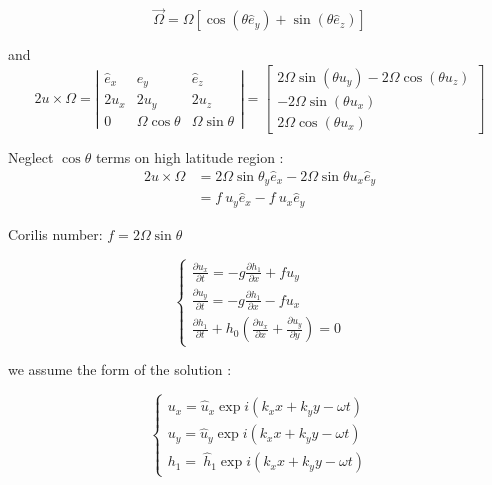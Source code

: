 \documentclass[fontset=windows]{report}
\begin{document}
\[\vec \Omega = \Omega[\cos (\theta\hat e_y)+\sin(\theta\hat e _z)]\]

and
\begin{equation}
  2u\times\Omega  =\left|
 \begin{matrix}
   \hat e_x & \hat e_y & \hat e_z \\
   2u_x & 2u_y & 2u_z \\
   0 & \Omega\cos\theta & \Omega\sin\theta
  \end{matrix}
  \right|
  =\left[
 \begin{matrix}
   2\Omega\sin (\theta u_y)-2\Omega\cos(\theta u_z) \\
   -2\Omega\sin(\theta u_x) \\
   2\Omega\cos(\theta u_x)
  \end{matrix}
  \right]
\end{equation}


Neglect \(\cos \theta\) terms on high latitude region :
\begin{equation}
  \begin{aligned}
    2u\times\Omega  &=2\Omega\sin \theta_y\hat e_x-2\Omega\sin\theta u_x \hat e_y\\
    &=f\ u_y\hat e_x-f\ u_x\hat e_y
    \end{aligned}
\end{equation}

Corilis number: \(f=2\Omega\sin \theta\)

\begin{equation*}
     \begin{cases}
         \frac{\partial u_x}{\partial t} = -g\frac{\partial h_1}{\partial x}+fu_y \\
         \frac{\partial u_y}{\partial t} = -g\frac{\partial h_1}{\partial x}-fu_x  \\ 
         \frac{\partial h_1}{\partial t}+h_0(\frac{\partial u_x}{\partial x}+\frac{\partial u_y}{\partial y}) = 0
     \end{cases}
 \end{equation*}

we assume the form of the solution :

\begin{equation*}
     \begin{cases}
         u_x = \hat u_x\exp i(k_x x+k_y y-\omega t)\\
         u_y = \hat u_y\exp i(k_x x+k_y y-\omega t)\\ 
         h_1 =\ \hat h_1\exp i(k_x x+k_y y-\omega t)
     \end{cases}
 \end{equation*}
\end{document}
